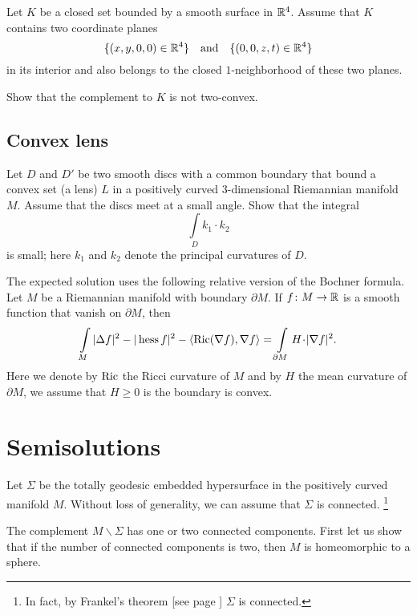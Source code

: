 \begin{pr}
Let $K$ be a closed set bounded by a smooth surface
in $\mathbb{R}^4$.
Assume that $K$ contains two coordinate planes 
$$\{(x,y,0,0)\in\mathbb{R}^4\}
\quad
\text{and}
\quad
\{(0,0,z,t)\in\mathbb{R}^4\}$$
in its interior 
and also belongs to the closed $1$-neighborhood of these two planes.

Show that the complement to $K$ is not two-convex.
\end{pr}


\subsection*{Convex lens\thm}
\label{Convex lens}

\begin{pr} Let $D$ and $D'$ be two smooth discs with a common boundary that bound a convex set (a lens) $L$ in a positively curved 3-dimensional Riemannian manifold $M$.
Assume that the discs meet at a small angle.
Show that the integral 
\[\int\limits_{D}k_1\cdot k_2\]
is small; here $k_1$ and $k_2$ denote the principal curvatures of $D$.
\end{pr}

The expected solution uses the following relative version of the Bochner formula.
Let $M$ be a Riemannian manifold with boundary $\partial M$.
If $f\colon M\to \mathbb{R}$ is a smooth function that vanish on $\partial M$,
then 
\[\int\limits_M |\Delta f|^2
-|\Hess f|^2
-\langle\mathrm{Ric}(\nabla f),\nabla f\rangle
=\int\limits_{\partial M}
H\cdot|\nabla f|^2.\]
Here we denote by $\operatorname{\rm Ric}$ the Ricci curvature of $M$ 
and by $H$ the mean curvature of $\partial M$, we assume that $H\ge 0$ is the boundary is convex.



\section*{Semisolutions}



Let $\Sigma$ be the totally geodesic embedded hypersurface in the positively curved manifold $M$.
Without loss of generality, we can assume that $\Sigma$ is connected.%
\footnote{In fact, by Frankel's theorem [see page \pageref{page:frankel}] $\Sigma$ is connected.}

The complement $M\backslash\Sigma$ has one or two connected components.
First let us show that if the number of connected components is two, 
then $M$ is homeomorphic to a sphere.


